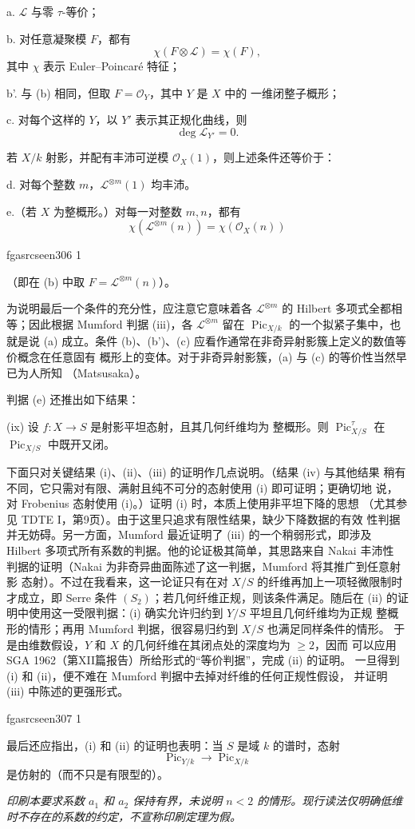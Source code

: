 \documentclass[12pt,twoside,openany]{book}
\numberwithin{equation}{section}
\newcommand{\fgaunitid}{unbound}
\newcommand{\src}[1]{%
  \phantomsection
  \hypertarget{src:\fgaunitid:#1}{}%
  \hypertarget{fga.\fgaunitid.p#1}{}%
  \ifcsname fgasrcseen#1\endcsname\else
    \expandafter\gdef\csname fgasrcseen#1\endcsname{1}%
    \hypertarget{src:#1}{}%
  \fi
  \marginpar{\raggedleft\footnotesize\sffamily #1}%
}
\theoremstyle{plain}
\theoremstyle{definition}
\theoremstyle{remark}
\begin{document}
\noindent a. $\mathcal L$ 与零 $\tau$-等价；

\noindent b. 对任意凝聚模 $F$，都有
\[
\chi(F\otimes\mathcal L)=\chi(F),
\]
其中 $\chi$ 表示 Euler--Poincaré 特征；

\noindent b'. 与 (b) 相同，但取 $F=\mathcal O_Y$，其中 $Y$ 是 $X$ 中的
一维闭整子概形；

\noindent c. 对每个这样的 $Y$，以 $Y'$ 表示其正规化曲线，则
\[
\deg\mathcal L_{Y'}=0.
\]

若 $X/k$ 射影，并配有丰沛可逆模 $\mathcal O_X(1)$，则上述条件还等价于：

\noindent d. 对每个整数 $m$，$\mathcal L^{\otimes m}(1)$ 均丰沛。

\noindent e.（若 $X$ 为整概形。）对每一对整数 $m,n$，都有
\[
\chi(\mathcal L^{\otimes m}(n))=\chi(\mathcal O_X(n))
\]

\src{306}
（即在 (b) 中取 $F=\mathcal L^{\otimes m}(n)$）。

为说明最后一个条件的充分性，应注意它意味着各
$\mathcal L^{\otimes m}$ 的 Hilbert 多项式全都相等；因此根据 Mumford
判据 (iii)，各 $\mathcal L^{\otimes m}$ 留在
$\operatorname{Pic}_{X/k}$ 的一个拟紧子集中，也就是说 (a) 成立。条件
(b)、(b')、(c) 应看作通常在非奇异射影簇上定义的数值等价概念在任意固有
概形上的变体。对于非奇异射影簇，(a) 与 (c) 的等价性当然早已为人所知
（Matsusaka）。

判据 (e) 还推出如下结果：

\medskip
\noindent(ix) 设 $f:X\longrightarrow S$ 是射影平坦态射，且其几何纤维均为
整概形。则 $\operatorname{Pic}_{X/S}^\tau$ 在
$\operatorname{Pic}_{X/S}$ 中既开又闭。

下面只对关键结果 (i)、(ii)、(iii) 的证明作几点说明。（结果 (iv) 与其他结果
稍有不同，它只需对有限、满射且纯不可分的态射使用 (i) 即可证明；更确切地
说，对 Frobenius 态射使用 (i)。）证明 (i) 时，本质上使用非平坦下降的思想
（尤其参见 TDTE I，第9页）。由于这里只追求有限性结果，缺少下降数据的有效
性判据并无妨碍。另一方面，Mumford 最近证明了 (iii) 的一个稍弱形式，即涉及
Hilbert 多项式所有系数的判据。他的论证极其简单，其思路来自 Nakai 丰沛性
判据的证明（Nakai 为非奇异曲面陈述了这一判据，Mumford 将其推广到任意射影
态射）。不过在我看来，这一论证只有在对 $X/S$ 的纤维再加上一项轻微限制时
才成立，即 Serre 条件 $(S_2)$；若几何纤维正规，则该条件满足。随后在 (ii)
的证明中使用这一受限判据：(i) 确实允许归约到 $Y/S$ 平坦且几何纤维均为正规
整概形的情形；再用 Mumford 判据，很容易归约到 $X/S$ 也满足同样条件的情形。
于是由维数假设，$Y$ 和 $X$ 的几何纤维在其闭点处的深度均为 $\geq2$，因而
可以应用 SGA 1962（第XII篇报告）所给形式的“等价判据”，完成 (ii) 的证明。
一旦得到 (i) 和 (ii)，便不难在 Mumford 判据中去掉对纤维的任何正规性假设，
并证明 (iii) 中陈述的更强形式。

\src{307}
最后还应指出，(i) 和 (ii) 的证明也表明：当 $S$ 是域 $k$ 的谱时，态射
\[
\operatorname{Pic}_{Y/k}\longrightarrow\operatorname{Pic}_{X/k}
\]
是仿射的（而不只是有限型的）。

\par\smallskip
\begingroup\footnotesize
\noindent\textit{印刷本要求系数 $a_1$ 和 $a_2$ 保持有界，未说明 $n<2$ 的情形。现行读法仅明确低维时不存在的系数的约定，不宣称印刷定理为假。}\par
\endgroup

\par
\end{document}
